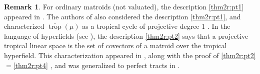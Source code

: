 \documentclass[11pt]{amsart}
\newcommand{\RR}{\mathbb R}
\newcommand{\PP}{\mathbb P}
\newcommand{\TT}{\mathbb T}
\newcommand{\trop}{\operatorname{trop}}
\newcommand{\cc}{\mathcal C}
\theoremstyle{definition}
\newtheorem{rem}[thm]{Remark}
\newcommand{\leon}[1]{{\color{teal} \sf Leon: [#1]}}
\newcommand{\chris}[1]{{\color{cyan} \sf Chris: [#1]}}
\begin{document}
\begin{thm:main2}
\end{thm:main2}

\begin{rem}\label{rem:previoustroplin}  For ordinary matroids (not valuated), the description \ref{thm2r:pt1} appeared in \cite[Definition 2.20]{Sha13}.  The authors of \cite{MR} also considered the description \ref{thm2r:pt1}, and characterized $\overline{\trop}(\mu)$ as a tropical cycle of projective degree 1 \cite[Remark 7.4.15]{MR}.  In the language of hyperfields (see \cite{BB19}), the description \ref{thm2r:pt2} says that a projective tropical linear space is the set of covectors of a matroid over the tropical hyperfield.  This characterization appeared in \cite{MT01}, along with the proof of \ref{thm2r:pt2}$=$\ref{thm2r:pt4} \cite[Theorem 3.8]{MT01}, and was generalized to perfect tracts in \cite{And19}. 
\end{rem}
\end{document}
